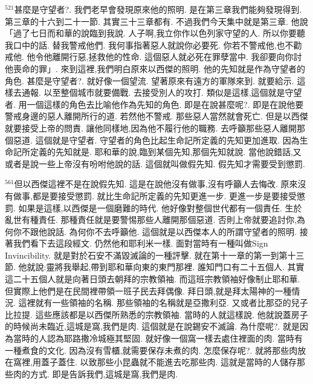 \documentclass{book}
\begin{document}
$^{521}$甚麼是守望者?.
我們老早會發現原來他的照明.
是在第三章我們能夠發現得到.
第三章的十六到二十一節.
其實三十三章都有.
不過我們今天集中就是第三章.
他說「過了七日而和華的說臨到我說.
人子啊,我立你作以色列家守望的人.
所以你要聽我口中的話.
替我警戒他們.
我何事指著惡人就說你必要死.
你若不警戒他,也不勸戒他.
他令他離開行惡,拯救他的性命.
這個惡人就必死在罪孽當中.
我卻要向你討他喪命的罪」.
來到這裡,我們明白原來以西傑的照明.
他的先知就是作為守望者的角色.
甚麼是守望者?.
就好像一個望流.
望著原來有遠方的軍隊來到.
就要給示.
這樣去通報.
以至整個城市就要備戰.
去接受別人的攻打.
類似是這樣,這個就是守望者.
用一個這樣的角色去比喻他作為先知的角色.
即是在說甚麼呢?.
即是在說他要警戒身邊的惡人離開所行的道.
若然他不警戒.
那些惡人當然就會死亡.
但是以西傑就要接受上帝的問責.
讓他同樣地,因為他不履行他的職務.
去呼籲那些惡人離開那個惡道.
這個就是守望者.
守望者的角色比起生命記所定義的先知更加進取.
因為生命記所定義的先知就是.
耶和華的說,臨到某個先知,那個先知就說.
當他說錯話,又或者是說一些上帝沒有吩咐他說的話.
這個就叫做假先知.
假先知才需要受到懲罰.

$^{561}$但以西傑這裡不是在說假先知.
這是在說他沒有做事,沒有呼籲人去悔改.
原來沒有做事,都是要接受懲罰.
就比生命記所定義的先知更進一步.
更進一步是要接受懲罰.
如果是這樣,以西傑是一個磨難的時代.
他好像對整個世代都有一個責任.
生於亂世有種責任.
那種責任就是要警惕那些人離開那個惡道.
否則上帝就要追討你,為何你不跟他說話.
為何你不去呼籲他.
這個就是以西傑本人的所謂守望者的照明.
接著我們看下去這段經文.
仍然他和耶利米一樣.
面對當時有一種叫做Sign Invincibility.
就是對於石安不滿毀滅論的一種評擊.
就在第十一章的第一到第十三節.
他就說:靈將我舉起,帶到耶和華向東的東門那裡.
誰知門口有二十五個人.
其實這二十五個人就是向著日頭去朝拜的宗教領袖.
而這班宗教領袖好像制止耶和華.
但實際上他們是在民間裡帶領一班子民去拜偶像.
拜日頭,就是拜太陽神的一種情況.
這裡就有一些領袖的名稱.
那些領袖的名稱就是亞撒利亞.
又或者比那亞的兒子比拉提.
這些應該都是以西傑所熟悉的宗教領袖.
當時的人就這樣說.
他就說蓋房子的時候尚未臨近,這城是窩,我們是肉.
這個就是在說錫安不滅論.
為什麼呢?.
就是因為當時的人認為耶路撒冷城極其堅固.
就好像一個窩一樣去處住裡面的肉.
當時有一種煮食的文化.
因為沒有雪櫃,就需要保存未煮的肉.
怎麼保存呢?.
就將那些肉放在窩裡,用蓋子蓋住.
以致那些小昆蟲就不能進去吃那些肉.
這就是當時的人儲存那些肉的方式.
即是告訴我們,這城是窩,我們是肉.
\end{document}
